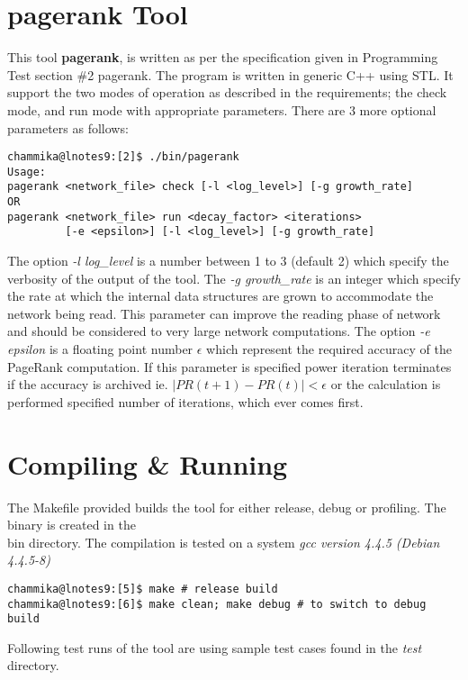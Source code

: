 \documentclass[10pt]{article}
\begin{document}
\maketitle

\section{pagerank Tool}
This tool \textbf{pagerank}, is written as per the specification given in Programming Test
section \#2 pagerank. The program is written in generic C++ using STL.
It support the two modes of operation as described in the requirements; the check mode, and
run mode with appropriate parameters. There are 3 more optional parameters as follows:
\begin{verbatim}
chammika@lnotes9:[2]$ ./bin/pagerank 
Usage:
pagerank <network_file> check [-l <log_level>] [-g growth_rate]
OR
pagerank <network_file> run <decay_factor> <iterations>
         [-e <epsilon>] [-l <log_level>] [-g growth_rate]
\end{verbatim}
The option \emph{-l log\_level} is a number between 1 to 3 (default 2) which specify the
verbosity of the output of the tool. The \emph{-g growth\_rate} is an integer which specify
the rate at which the internal data structures are grown to accommodate the network being read.
This parameter can improve the reading phase of network and should be considered to very large
network computations. The option \emph{-e epsilon} is a floating point number $\epsilon$ which 
represent the required accuracy of the PageRank computation. If this parameter is specified power 
iteration terminates if the accuracy is archived ie. $| PR(t+1) - PR(t) | < \epsilon$ or the
calculation is performed specified number of iterations, which ever comes first.

\section{Compiling \& Running}
The Makefile provided builds the tool for either release, debug or profiling. The binary is created
in the \\bin directory. The compilation is tested on a system \emph{gcc version 4.4.5 
(Debian 4.4.5-8)}

\begin{verbatim}
chammika@lnotes9:[5]$ make # release build
chammika@lnotes9:[6]$ make clean; make debug # to switch to debug build
\end{verbatim}
Following test runs of the tool are using sample test cases found in the \emph{\/test} directory.
\end{document}
